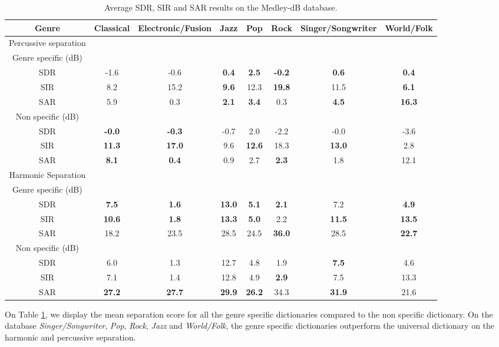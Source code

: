 \documentclass{article}
\begin{document}
\begin{table}
   
\begin{tabular}{|c|c|c|c|c|c|c|c|}
\hline   
Genre & Classical & Electronic/Fusion & Jazz & Pop & Rock & Singer/Songwriter & World/Folk \\
\hline
Percussive separation & & & & & & & \\
\hline
Genre specific (dB)  & & & & & & & \\
SDR & -1.6     & -0.6     &\bf{0.4} & \bf{2.5}&\bf{-0.2}& \bf{0.6} & \bf{0.4} \\
SIR & 8.2      & 15.2     &\bf{9.6} & 12.3    &\bf{19.8}& 11.5     & \bf{6.1} \\
SAR & 5.9      & 0.3      &\bf{2.1} & \bf{3.4}& 0.3    & \bf{4.5} & \bf{16.3} \\
\hline
Non specific (dB) & & & & & & &\\
SDR & \bf{-0.0}& \bf{-0.3}& -0.7    & 2.0     & -2.2    & -0.0     & -3.6 \\
SIR & \bf{11.3} & \bf{17.0}& 9.6     &\bf{12.6}& 18.3    & \bf{13.0}& 2.8 \\
SAR & \bf{8.1} & \bf{0.4} & 0.9     & 2.7     &\bf{2.3} & 1.8      & 12.1 \\
\hline   
Harmonic Separation &  & & & & & & \\  
\hline
Genre specific (dB)  & & & & & & & \\
SDR & \bf{7.5}    & \bf{1.6}    & \bf{13.0} & \bf{5.1}  & \bf{2.1}& 7.2      &\bf{4.9} \\
SIR & \bf{10.6}   & \bf{1.8}    & \bf{13.3} & \bf{5.0 } & 2.2     & \bf{11.5}& \bf{13.5} \\
SAR & 18.2       & 23.5       & 28.5      & 24.5      &\bf{36.0}& 28.5     & \bf{22.7} \\
\hline
Non specific (dB) & & & & & & &\\
SDR & 6.0        & 1.3       & 12.7     & 4.8      & 1.9      & \bf{7.5}      & 4.6\\
SIR & 7.1       & 1.4        & 12.8     & 4.9      & \bf{2.9} & 7.5      & 13.3 \\
SAR & \bf{27.2}& \bf{27.7}   & \bf{29.9} & \bf{26.2}& 34.3     &\bf{31.9} & 21.6\\
\hline
  \end{tabular} 
\caption{\label{specresults} Average SDR, SIR and SAR results on the Medley-dB database.}
\end{table}



On Table \ref{specresults}, we display the mean separation score for all the genre specific dictionaries compared to the non specific dictionary. On the database \emph{Singer/Songwriter}, \emph{Pop}, \emph{Rock}, \emph{Jazz} and \emph{World/Folk}, the genre specific dictionaries outperform the universal dictionary on the harmonic and percussive separation.
\end{document}
